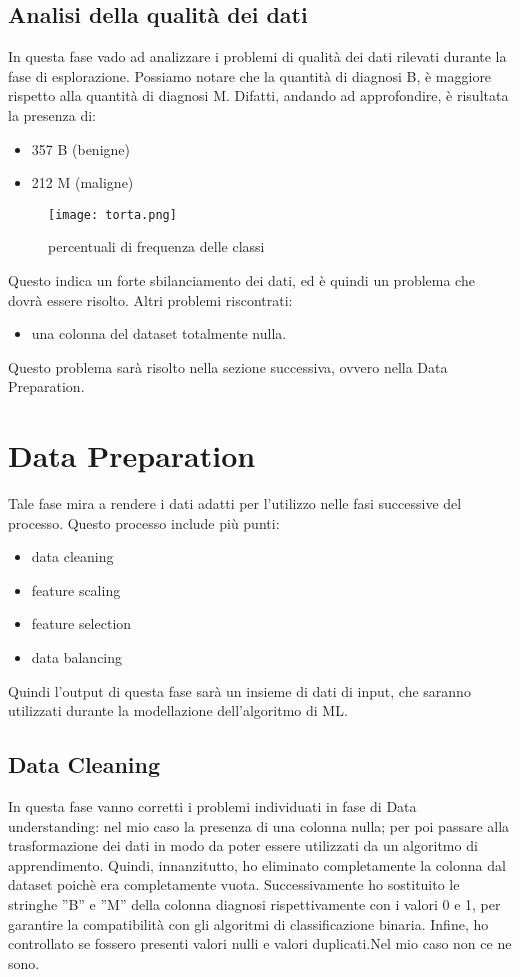 \documentclass{article}
\begin{document}
\subsection{Analisi della qualità dei dati}
In questa fase vado ad analizzare i problemi di qualità dei dati rilevati durante la fase di esplorazione.
Possiamo  notare che la quantità di diagnosi B, è  maggiore rispetto alla quantità di diagnosi M. Difatti, andando ad approfondire, è risultata la presenza di:
\begin{itemize}
    \item 357 B (benigne)
    \item 212  M (maligne)
\end{itemize}
    \begin{figure}
        \centering
        \texttt{[image: torta.png]}
        \caption{percentuali di frequenza delle classi}
        \label{fig:enter-label}
    \end{figure}

\newpage
Questo indica un forte sbilanciamento dei dati, ed è quindi un problema che dovrà essere risolto.
Altri problemi riscontrati:
\begin{itemize}
    \item una colonna del dataset totalmente nulla.
\end{itemize}
Questo problema sarà risolto nella sezione successiva, ovvero nella Data Preparation.

\newpage
\section{Data Preparation}
Tale fase mira a rendere i dati adatti per l’utilizzo nelle fasi successive del processo.
Questo processo include più punti:
\begin{itemize}
    \item data cleaning
    \item feature scaling
    \item feature selection
    \item data balancing
\end{itemize}
Quindi l’output di questa fase sarà un insieme di dati di input, che saranno utilizzati durante la
modellazione dell’algoritmo di ML.

\subsection{Data Cleaning}
In questa fase vanno corretti i problemi individuati in fase di Data understanding: nel mio caso la presenza di una colonna nulla; per poi passare alla trasformazione dei dati in modo da poter essere utilizzati da un algoritmo di apprendimento.
Quindi, innanzitutto, ho eliminato completamente la colonna dal dataset poichè era completamente vuota. Successivamente ho sostituito le stringhe ”B” e ”M” della colonna diagnosi rispettivamente con i valori 0 e 1, per garantire la compatibilità con gli algoritmi di classificazione binaria. Infine, ho controllato se fossero presenti valori nulli e valori duplicati.Nel mio caso non ce ne sono.
\end{document}
